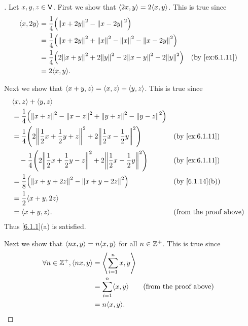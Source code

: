 \begin{proof}[]
  Let \(x, y, z \in \mathsf{V}\).
  First we show that \(\inn{2x, y} = 2 \inn{x, y}\).
  This is true since
  \begin{align*}
    \inn{x, 2y} & = \dfrac{1}{4} \pa{\norm{x + 2y}^2 - \norm{x - 2y}^2}                                                     \\
                & = \dfrac{1}{4} \pa{\norm{x + 2y}^2 + \norm{x}^2 - \norm{x}^2 - \norm{x - 2y}^2}                           \\
                & = \dfrac{1}{4} \pa{2 \norm{x + y}^2 + 2 \norm{y}^2 - 2 \norm{x - y}^2 - 2 \norm{y}^2} &  & \by{ex:6.1.11} \\
                & = 2 \inn{x, y}.
  \end{align*}

  Next we show that \(\left\langle x + y, z\right\rangle = \left\langle x, z\right\rangle + \left\langle y, z\right\rangle\).
  This is true since
  \begin{align*}
     & \inn{x, z} + \inn{y, z}                                                                                                                                  \\
     & = \dfrac{1}{4} \pa{\norm{x + z}^2 - \norm{x - z}^2 + \norm{y + z}^2 - \norm{y - z}^2}                                                                    \\
     & = \dfrac{1}{4} \pa{2 \norm{\dfrac{1}{2} x + \dfrac{1}{2} y + z}^2 + 2 \norm{\dfrac{1}{2} x - \dfrac{1}{2} y}^2}       &  & \by{ex:6.1.11}                \\
     & \quad - \dfrac{1}{4} \pa{2 \norm{\dfrac{1}{2} x + \dfrac{1}{2} y - z}^2 + 2 \norm{\dfrac{1}{2} x - \dfrac{1}{2} y}^2} &  & \by{ex:6.1.11}                \\
     & = \dfrac{1}{8} \pa{\norm{x + y + 2z}^2 - \norm{x + y - 2z}^2}                                                         &  & \by{6.1.14}[b]                \\
     & = \dfrac{1}{2} \inn{x + y, 2z}                                                                                                                           \\
     & = \inn{x + y, z}.                                                                                                     &  & \text{(from the proof above)}
  \end{align*}
  Thus \cref{6.1.1}(a) is satisfied.

  Next we show that \(\inn{nx, y} = n \inn{x, y}\) for all \(n \in \mathbb{Z}^+\).
  This is true since
  \begin{align*}
    \forall n \in \Z^+, \inn{nx, y} & = \inn{\sum_{i = 1}^n x, y}                                    \\
                                    & = \sum_{i = 1}^n \inn{x, y} &  & \text{(from the proof above)} \\
                                    & = n \inn{x, y}.
  \end{align*}


\end{proof}
